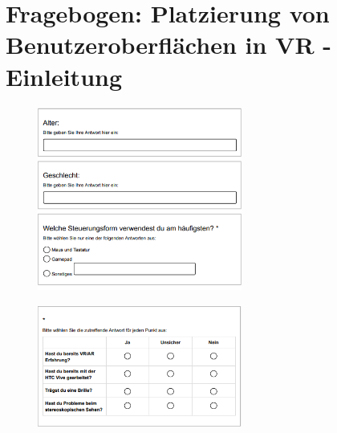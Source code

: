 
\chapter{Fragebogen: Platzierung von Benutzeroberflächen in VR - Einleitung}\label{chapter:fragen}
	\begin{figure}[htbp]
		\centering
		\includegraphics[width=0.6\textwidth]{Fragen/1Einleitung.png}
	\end{figure}

	\begin{figure}[htbp]
		\centering
		\includegraphics[width=0.6\textwidth]{Fragen/2Einleitung.png}
	\end{figure}